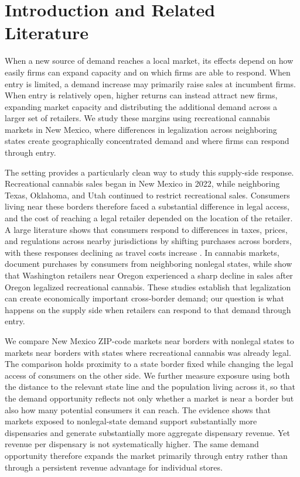 \documentclass[english,12pt]{article}
\begin{document}
\doublespacing


\section{Introduction and Related Literature}
\label{sec:introduction}

When a new source of demand reaches a local market, its effects depend on how easily firms can expand capacity and on which firms are able to respond. When entry is limited, a demand increase may primarily raise sales at incumbent firms. When entry is relatively open, higher returns can instead attract new firms, expanding market capacity and distributing the additional demand across a larger set of retailers. We study these margins using recreational cannabis markets in New Mexico, where differences in legalization across neighboring states create geographically concentrated demand and where firms can respond through entry.

The setting provides a particularly clean way to study this supply-side response. Recreational cannabis sales began in New Mexico in 2022, while neighboring Texas, Oklahoma, and Utah continued to restrict recreational sales. Consumers living near these borders therefore faced a substantial difference in legal access, and the cost of reaching a legal retailer depended on the location of the retailer. A large literature shows that consumers respond to differences in taxes, prices, and regulations across nearby jurisdictions by shifting purchases across borders, with these responses declining as travel costs increase \citep{KanburKeen1993,Nielsen2001,AsplundFribergWilander2007,Lovenheim2008,ChandraHeadTappata2014}. In cannabis markets, \citet{HaoCowan2020} document purchases by consumers from neighboring nonlegal states, while \citet{HansenMillerWeber2020} show that Washington retailers near Oregon experienced a sharp decline in sales after Oregon legalized recreational cannabis. These studies establish that legalization can create economically important cross-border demand; our question is what happens on the supply side when retailers can respond to that demand through entry.

We compare New Mexico ZIP-code markets near borders with nonlegal states to markets near borders with states where recreational cannabis was already legal. The comparison holds proximity to a state border fixed while changing the legal access of consumers on the other side. We further measure exposure using both the distance to the relevant state line and the population living across it, so that the demand opportunity reflects not only whether a market is near a border but also how many potential consumers it can reach. The evidence shows that markets exposed to nonlegal-state demand support substantially more dispensaries and generate substantially more aggregate dispensary revenue. Yet revenue per dispensary is not systematically higher. The same demand opportunity therefore expands the market primarily through entry rather than through a persistent revenue advantage for individual stores.
\end{document}
